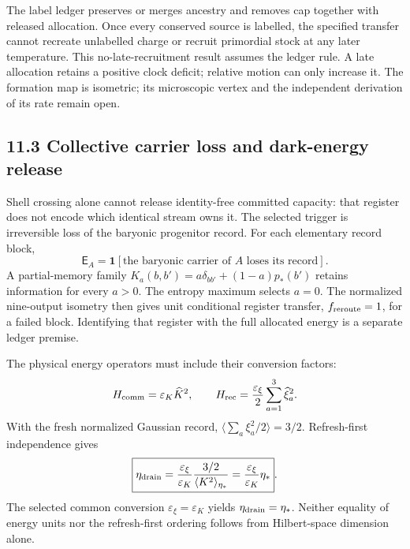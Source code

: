 \documentclass[11pt]{article}
\begin{document}
The label ledger preserves or merges ancestry and removes cap together
with released allocation. Once every conserved source is labelled,
the specified transfer cannot recreate unlabelled charge or recruit
primordial stock at any later temperature. This no-late-recruitment
result assumes the ledger rule. A late allocation retains a positive clock deficit;
relative motion can only increase it.
The formation map is isometric; its microscopic vertex and the
independent derivation of its rate remain open.

\subsection{11.3 Collective carrier loss and dark-energy release}

Shell crossing alone cannot release identity-free committed capacity: that register does not encode which identical stream owns it. The selected trigger is irreversible loss of the baryonic progenitor record. For each elementary record block,
\[
\mathsf E_A=\mathbf1[\text{the baryonic carrier of }A\text{ loses its record}].
\]
A partial-memory family $K_a(b,b')=a\delta_{bb'}+(1-a)p_*(b')$ retains information for every $a>0$. The entropy maximum selects $a=0$. The normalized nine-output isometry then gives unit conditional register transfer, $f_{\rm reroute}=1$, for a failed block. Identifying that register with the full allocated energy is a separate ledger premise.

The physical energy operators must include their conversion factors:
\[
H_{\rm comm}=\varepsilon_K\widehat K^2,
\qquad H_{\rm rec}=\frac{\varepsilon_\xi}{2}\sum_{a=1}^3\widehat\xi_a^2.
\]
With the fresh normalized Gaussian record, $\langle\sum_a\xi_a^2/2\rangle=3/2$. Refresh-first independence gives
\[
\boxed{\eta_{\rm drain}=\frac{\varepsilon_\xi}{\varepsilon_K}
\frac{3/2}{\langle K^2\rangle_{\eta_*}}
=\frac{\varepsilon_\xi}{\varepsilon_K}\eta_*}.
\]
The selected common conversion $\varepsilon_\xi=\varepsilon_K$ yields $\eta_{\rm drain}=\eta_*$. Neither equality of energy units nor the refresh-first ordering follows from Hilbert-space dimension alone.
\end{document}
